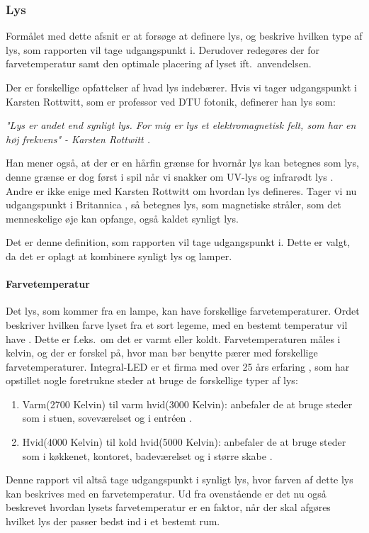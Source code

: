 \subsubsection{Lys}
\label{sec:lys}
Formålet med dette afsnit er at forsøge at definere lys, og beskrive hvilken type af lys, som rapporten vil tage udgangspunkt i. Derudover redegøres der for farvetemperatur samt den optimale placering af lyset ift.\ anvendelsen.


Der er forskellige opfattelser af hvad lys indebærer. Hvis vi tager udgangspunkt i Karsten Rottwitt, som er professor ved DTU fotonik, definerer han lys som:


\textit{"Lys er andet end synligt lys. For mig er lys et elektromagnetisk felt, som har en høj frekvens"
- Karsten Rottwitt \cite{def_lys}.}

Han mener også, at der er en hårfin grænse for hvornår lys kan betegnes som lys, denne grænse er dog først i spil når vi snakker om UV-lys og infrarødt lys \cite{def_lys}. 
Andre er ikke enige med Karsten Rottwitt om hvordan lys defineres. Tager vi nu udgangspunkt i Britannica \cite{britannica_lys}, så betegnes lys, som magnetiske stråler, som det menneskelige øje kan opfange, også kaldet synligt lys. 


Det er denne definition, som rapporten vil tage udgangspunkt i. Dette er valgt, da det er oplagt at kombinere synligt lys og lamper.

\paragraph{Farvetemperatur}
Det lys, som kommer fra en lampe, kan have forskellige farvetemperaturer. Ordet beskriver hvilken farve lyset fra et sort legeme, med en bestemt temperatur vil have \cite{farvetemp}. Dette er f.eks.\ om det er varmt eller koldt. Farvetemperaturen måles i kelvin, og der er forskel på, hvor man bør benytte pærer med forskellige farvetemperaturer. Integral-LED er et firma med over 25 års erfaring \cite{integral_led}, som har opstillet nogle foretrukne steder at bruge de forskellige typer af lys:

\begin{enumerate}
\item Varm(2700 Kelvin) til varm hvid(3000 Kelvin): anbefaler de at bruge steder som i stuen, soveværelset og i entréen \cite{varm_kold}.
\item Hvid(4000 Kelvin) til kold hvid(5000 Kelvin): anbefaler de at bruge steder som i køkkenet, kontoret, badeværelset og i større skabe \cite{varm_kold}.
\end{enumerate}

Denne rapport vil altså tage udgangspunkt i synligt lys, hvor farven af dette lys kan beskrives med en farvetemperatur. Ud fra ovenstående er det nu også beskrevet hvordan lysets farvetemperatur er en faktor, når der skal afgøres hvilket lys der passer bedst ind i et bestemt rum.
